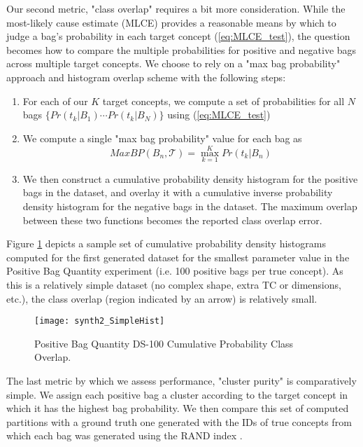 \documentclass[12pt,dvips]{report}
\numberwithin{equation}{section}
\begin{document}
Our second metric, "class overlap" requires a bit more consideration.  While the most-likely cause estimate (MLCE) provides a reasonable means by which to judge a bag's probability in each target concept (\ref{eq:MLCE_test}), the question becomes how to compare the multiple probabilities for positive and negative bags across multiple target concepts.  We choose to rely on a "max bag probability" approach and histogram overlap scheme with the following steps:
\begin{enumerate}
\item For each of our $K$ target concepts, we compute a set of probabilities for all $N$ bags $\{Pr(t_k\vert B_1)\cdots Pr(t_k\vert B_N)\}$ using (\ref{eq:MLCE_test})
\item We compute a single "max bag probability" value for each bag as 
\begin{equation} \label{eq:max_bagprob}
MaxBP(B_{n},\mathcal{T}) = \max_{k=1}^{K}Pr(t_k\vert B_{n})
\end{equation}
\item We then construct a cumulative probability density histogram for the positive bags in the dataset, and overlay it with a cumulative inverse probability density histogram for the negative bags in the dataset. The maximum overlap between these two functions becomes the reported class overlap error.
\end{enumerate}

Figure \ref{fig:Synth2_SimpleHist} depicts a sample set of cumulative probability density histograms computed for the first generated dataset for the smallest parameter value in the Positive Bag Quantity experiment (i.e. 100 positive bags per true concept).  As this is a relatively simple dataset (no complex shape, extra TC or dimensions, etc.), the class overlap (region indicated by an arrow) is relatively small.

\begin{figure}[htb]
 \texttt{[image: synth2\_SimpleHist]}
 
\caption{Positive Bag Quantity DS-100 Cumulative Probability Class Overlap.}\label{fig:Synth2_SimpleHist}
\end{figure}

The last metric by which we assess performance, "cluster purity" is comparatively simple.  We assign each positive bag a cluster according to the target concept in which it has the highest bag probability.  We then compare this set of computed partitions with a ground truth one generated with the IDs of true concepts from which each bag was generated using the RAND index \cite{rand1971objective}.
\end{document}
